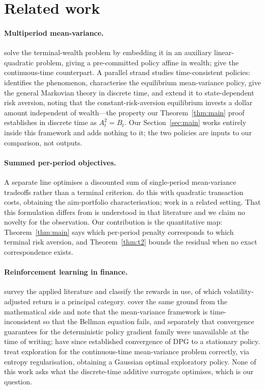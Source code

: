 \documentclass[11pt,a4paper]{article}
\theoremstyle{plain}
\theoremstyle{definition}
\theoremstyle{remark}
\begin{document}
\section{Related work}\label{sec:related}

\paragraph{Multiperiod mean-variance.} \citet{ling} solve the terminal-wealth
problem by embedding it in an auxiliary linear-quadratic problem, giving a
pre-committed policy affine in wealth; \citet{zhouli} give the continuous-time
counterpart. A parallel strand studies time-consistent policies:
\citet{strotz} identifies the phenomenon, \citet{basak} characterise the
equilibrium mean-variance policy, \citet{bjork} give the general Markovian
theory in discrete time, and \citet{bjorkzhou} extend it to state-dependent risk
aversion, noting that the constant-risk-aversion equilibrium invests a dollar
amount independent of wealth---the property our Theorem~\ref{thm:main} proof
establishes in discrete time as $A_t^2=B_t$. Our Section~\ref{sec:main} works entirely inside this
framework and adds nothing to it; the two policies are inputs to our comparison,
not outputs.

\paragraph{Summed per-period objectives.} A separate line optimises a discounted
sum of single-period mean-variance tradeoffs rather than a terminal criterion.
\citet{garleanu} do this with quadratic transaction costs, obtaining the
aim-portfolio characterisation; \citet{demiguel} work in a related setting. That
this formulation differs from \citet{ling} is understood in that literature and
we claim no novelty for the observation. Our contribution is the quantitative
map: Theorem~\ref{thm:main} says which per-period penalty corresponds to which
terminal risk aversion, and Theorem~\ref{thm:t2} bounds the residual when no
exact correspondence exists.

\paragraph{Reinforcement learning in finance.} \citet{bai} survey the applied
literature and classify the rewards in use, of which volatility-adjusted return
is a principal category. \citet{hambly} cover the same ground from the
mathematical side and note that the mean-variance framework is time-inconsistent
so that the Bellman equation fails, and separately that convergence guarantees
for the deterministic policy gradient family were unavailable at the time of
writing; \citet{xiong} have since established convergence of DPG to a stationary
policy. \citet{wang} treat exploration for the continuous-time mean-variance
problem correctly, via entropy regularisation, obtaining a Gaussian optimal
exploratory policy. None of this work asks what the discrete-time additive
surrogate optimises, which is our question.
\end{document}
